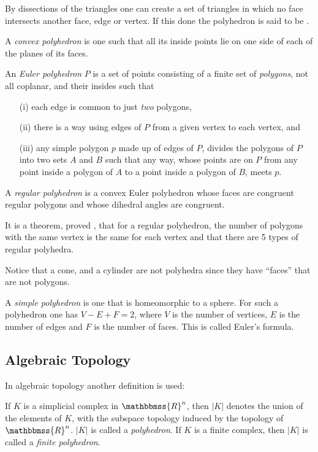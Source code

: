 \documentclass[12pt]{article}
\newcommand{\mathbb}[1]{\mathbbmss{#1}}
\begin{document}
By dissections of the triangles one can create a set of triangles in which
no face intersects another face, edge or vertex. If this done the
polyhedron is said to be \emph{}.
 
A \emph{convex polyhedron} is one such that all its inside points lie on one side of
each of the planes of its faces. 

An \emph{Euler polyhedron}  $P$ is a set of points consisting of a finite set
of \emph{polygons}, not all coplanar, and their insides such that
\begin{itemize}
\item[(i)] each edge is common to just \emph{two} polygons, 
\item[(ii)] there is a way using edges of $P$ from a given vertex to each vertex, and
\item[(iii)] any simple polygon $p$ made up of edges of $P$, divides the polygons
of $P$ into two sets  $A$ and $B$ such that any way, whose points are on $P$
from any point inside a polygon of $A$ to a point inside a polygon of $B$,
meets $p$. 
\end{itemize}

A \emph{regular polyhedron} is a convex Euler polyhedron whose faces are congruent 
regular polygons and whose dihedral angles are congruent.

It is a theorem, proved , that for a regular polyhedron, the number of polygons with the same
vertex is the same for each vertex and that there are 5 types of regular polyhedra.


Notice that a cone, and a cylinder are not polyhedra since they have ``faces'' that are not polygons.

A \emph{simple polyhedron} is one that is homeomorphic to a sphere. For such a polyhedron
one has $V-E+F = 2$, where $V$ is the number of vertices, $E$ is the number of edges
and $F$ is the number of faces. This is called Euler's formula. 

\subsection*{Algebraic Topology}
In algebraic topology another definition is used:

If $K$ is a simplicial complex in ${\mathbb{R}}^n$, then $|K|$ denotes the union of the elements of 
$K$, with the subspace topology induced by the topology of ${\mathbb{R}}^n$.
$|K|$ is called a \emph{polyhedron}. If $K$ is a finite complex, then
$|K|$ is called a \emph{finite polyhedron}.
\end{document}
